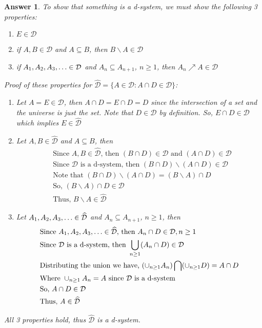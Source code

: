 \documentclass[12pt]{article}
\theoremstyle{colon}
\newtheorem*{answer}{Answer}
\begin{document}
\begin{answer}
  To show that something is a d-system, we must show the following 3 properties:

  \begin{enumerate}
    \item $E \in \mathcal{D}$
    \item if $A, B \in \mathcal{D}$ and $A \subseteq B$, then $ B \backslash A \in \mathcal{D}$
    \item if $A_1, A_2, A_3, \mathellipsis \in \mathcal{D}$ and $A_n \subseteq A_{n+1}$, $n \geq 1$, then $A_n \nearrow A \in \mathcal{D}$
  \end{enumerate}

  Proof of these properties for $\widehat{\mathcal{D}} = \{A \in \mathcal{D}: A \cap D \in \mathcal{D}\}$:

  \begin{enumerate}
    \item Let $A = E \in \mathcal{D}$, then $A \cap D = E \cap D = D$ since the intersection of a set and the universe is just the set. Note that $D \in \mathcal{D}$ by definition. So, $E \cap D \in \mathcal{D}$ which implies $E \in \widehat{\mathcal{D}}$
    \item Let $A, B \in \widehat{\mathcal{D}}$ and $A \subseteq B$, then
      \begin{align*}
        & \text{Since $A, B \in \widehat{\mathcal{D}}$, then } (B \cap D) \in \mathcal{D} \text{ and } (A \cap D) \in \mathcal{D} \\
        & \text{Since  $\mathcal{D}$ is a d-system, then } (B \cap D) \backslash (A \cap D) \in \mathcal{D} \\
        & \text{Note that } (B \cap D) \backslash (A \cap D) =(B \backslash A) \cap D \\
        & \text{So, } (B \backslash A) \cap D \in \mathcal{D} \\
        & \text{Thus, } B \backslash A \in \widehat{\mathcal{D}}
      \end{align*}
    \item Let $A_1, A_2, A_3, \mathellipsis \in \widehat{\mathcal{D}}$ and $A_n \subseteq A_{n+1}$, $n \geq 1$, then
      \begin{align*}
        & \text{Since $A_1, A_2, A_3, \mathellipsis \in \widehat{\mathcal{D}}$, then } A_n \cap D \in \mathcal{D}, n \geq 1 \\
        & \text{Since  $\mathcal{D}$ is a d-system, then } \bigcup\limits_{n \geq 1}(A_n \cap D) \in \mathcal{D} \\
        & \text{Distributing the union we have, } (\cup_{n \geq 1}A_n) \bigcap (\cup_{n \geq 1}D) = A \cap D \\
        & \text{Where } \cup_{n \geq 1}A_n = A \text{ since $\mathcal{D}$ is a d-system} \\
        & \text{So, } A \cap D \in \mathcal{D} \\
        & \text{Thus, } A \in \widehat{\mathcal{D}}
      \end{align*}
  \end{enumerate}

  All 3 properties hold, thus $\widehat{\mathcal{D}}$ is a d-system.
\end{answer}
\end{document}
